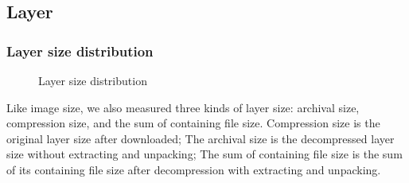 \subsection{Layer}

\subsubsection{Layer size distribution}

\begin{figure}[!t]
	\centering
	\caption{Layer size distribution}
	\label{fig-layer-size}
\end{figure}

Like image size, we also measured three kinds of layer size: archival size, compression size, and the sum of containing file size. Compression size is the original layer size after downloaded; The archival size is the decompressed layer size without extracting and unpacking; The sum of containing file size is the sum of its containing file size after decompression with extracting and unpacking.

